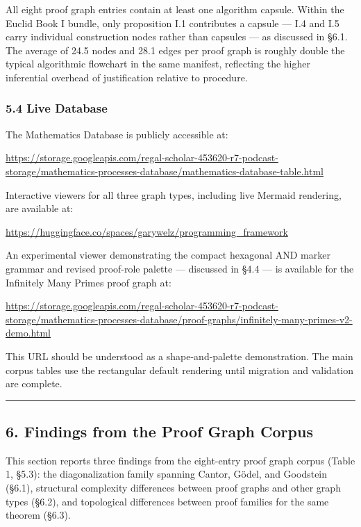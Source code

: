 \documentclass[
  11pt]{article}
\begin{document}
All eight proof graph entries contain at least one algorithm capsule.
Within the Euclid Book I bundle, only proposition I.1 contributes a
capsule --- I.4 and I.5 carry individual construction nodes rather than
capsules --- as discussed in §6.1. The average of 24.5 nodes and 28.1
edges per proof graph is roughly double the typical algorithmic
flowchart in the same manifest, reflecting the higher inferential
overhead of justification relative to procedure.

\hypertarget{54-live-database}{%
\subsubsection{5.4 Live Database}\label{54-live-database}}

The Mathematics Database is publicly accessible at:

\url{https://storage.googleapis.com/regal-scholar-453620-r7-podcast-storage/mathematics-processes-database/mathematics-database-table.html}

Interactive viewers for all three graph types, including live Mermaid
rendering, are available at:

\url{https://huggingface.co/spaces/garywelz/programming_framework}

An experimental viewer demonstrating the compact hexagonal AND marker
grammar and revised proof-role palette --- discussed in §4.4 --- is
available for the Infinitely Many Primes proof graph at:

\url{https://storage.googleapis.com/regal-scholar-453620-r7-podcast-storage/mathematics-processes-database/proof-graphs/infinitely-many-primes-v2-demo.html}

This URL should be understood as a shape-and-palette demonstration. The
main corpus tables use the rectangular default rendering until migration
and validation are complete.

\begin{center}\rule{0.5\linewidth}{0.5pt}\end{center}

\hypertarget{6-findings-from-the-proof-graph-corpus}{%
\subsection{6. Findings from the Proof Graph
Corpus}\label{6-findings-from-the-proof-graph-corpus}}

This section reports three findings from the eight-entry proof graph
corpus (Table 1, §5.3): the diagonalization family spanning Cantor,
Gödel, and Goodstein (§6.1), structural complexity differences between
proof graphs and other graph types (§6.2), and topological differences
between proof families for the same theorem (§6.3).
\end{document}
